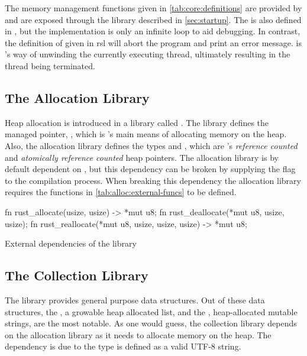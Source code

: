 The memory management functions given in \autoref{tab:core:definitions} are provided by  and are exposed through the  library described in \autoref{sec:startup}.
The  is also defined in , but the implementation is only an infinite loop to aid debugging.
In contrast, the definition of  given in \gls{rsl} will abort the program and print an error message.
 is {\rust}'s way of unwinding the currently executing thread, ultimately resulting in the thread being terminated.

\subsection{The Allocation Library}
\label{sec:rust:allocation}

Heap allocation is introduced in a library called .
The library defines the managed pointer, , which is {\rust}'s main means of allocating memory on the heap.
Also, the allocation library defines the types  and , which are {\rust}'s \emph{reference counted} and \emph{atomically reference counted} heap pointers.
The allocation library is by default dependent on , but this dependency can be broken by supplying the  flag to the compilation process.
When breaking this dependency the allocation library requires the functions in \autoref{tab:alloc:external-funcs} to be defined.

\begin{listing}[H]
  \begin{rustcode}
fn rust_allocate(usize, usize) -> *mut u8;
fn rust_deallocate(*mut u8, usize, usize);
fn rust_reallocate(*mut u8, usize, usize, usize) -> *mut u8;
  \end{rustcode}
  \caption{External dependencies of the  library}
  \label{tab:alloc:external-funcs}
\end{listing}

\subsection{The Collection Library}

The {\rust}  library provides general purpose data structures.
Out of these data structures, the , a growable heap allocated list, and the , heap-allocated mutable strings, are the most notable.
As one would guess, the collection library depends on the allocation library as it needs to allocate memory on the heap.
The  dependency is due to the  type is defined as a valid UTF-8 string.
